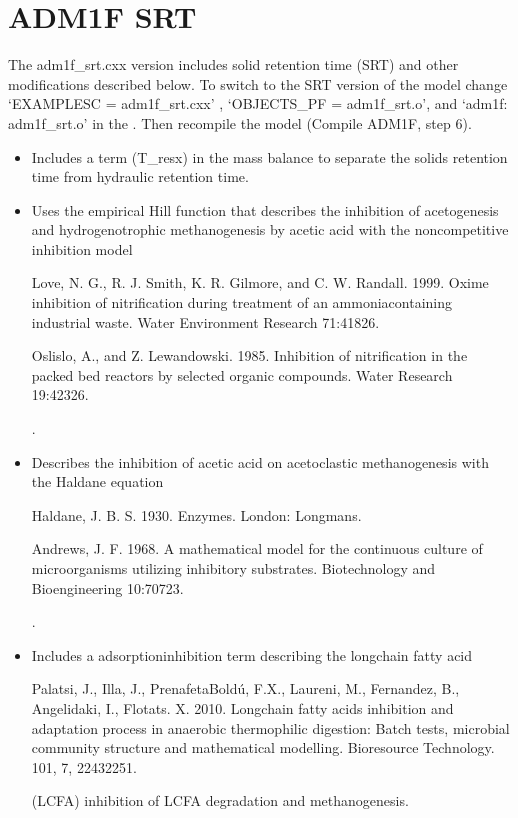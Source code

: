 \documentclass[a4paper,10pt,english]{sphinxmanual}
\begin{document}
\chapter{ADM1F SRT}
\label{\detokenize{compile:adm1f-srt}}\label{\detokenize{compile:id1}}
\sphinxAtStartPar
The adm1f\_srt.cxx version includes solid retention time (SRT) and other modifications described below. To switch to the SRT version of the model change ‘EXAMPLESC  = adm1f\_srt.cxx’ , ‘OBJECTS\_PF = adm1f\_srt.o’, and ‘adm1f: adm1f\_srt.o’ in the . Then recompile the model (Compile ADM1F, step 6).
\begin{itemize}
\item {} 
\sphinxAtStartPar
Includes a term (T\_resx) in the mass balance to separate the solids retention time from hydraulic retention time.

\item {} 
\sphinxAtStartPar
Uses the empirical Hill function that describes the inhibition of acetogenesis and hydrogenotrophic methanogenesis by acetic acid with the noncompetitive inhibition model %
\begin{footnote}[1]\sphinxAtStartFootnote
Love, N. G., R. J. Smith, K. R. Gilmore, and C. W. Randall. 1999. Oxime inhibition of nitrification during treatment of an ammonia\sphinxhyphen{}containing industrial waste. Water Environment Research 71:418\textendash{}26.
%
\end{footnote} %
\begin{footnote}[2]\sphinxAtStartFootnote
Oslislo, A., and Z. Lewandowski. 1985. Inhibition of nitrification in the packed bed reactors by selected organic compounds. Water Research 19:423\textendash{}26.
%
\end{footnote}.

\item {} 
\sphinxAtStartPar
Describes the inhibition of acetic acid on acetoclastic methanogenesis with the Haldane equation %
\begin{footnote}[3]\sphinxAtStartFootnote
Haldane, J. B. S. 1930. Enzymes. London: Longmans.
%
\end{footnote} %
\begin{footnote}[4]\sphinxAtStartFootnote
Andrews, J. F. 1968. A mathematical model for the continuous culture of microorganisms utilizing inhibitory substrates. Biotechnology and Bioengineering 10:707\textendash{}23.
%
\end{footnote}.

\item {} 
\sphinxAtStartPar
Includes a adsorption\sphinxhyphen{}inhibition term describing the long\sphinxhyphen{}chain fatty acid %
\begin{footnote}[6]\sphinxAtStartFootnote
Palatsi, J., Illa, J., Prenafeta\sphinxhyphen{}Boldú, F.X., Laureni, M., Fernandez, B., Angelidaki, I., Flotats. X. 2010. Long\sphinxhyphen{}chain fatty acids inhibition and adaptation process in anaerobic thermophilic digestion: Batch tests, microbial community structure and mathematical modelling. Bioresource Technology. 101, 7, 2243\sphinxhyphen{}2251.
%
\end{footnote} (LCFA) inhibition of LCFA degradation and methanogenesis.


\end{itemize}
\end{document}
